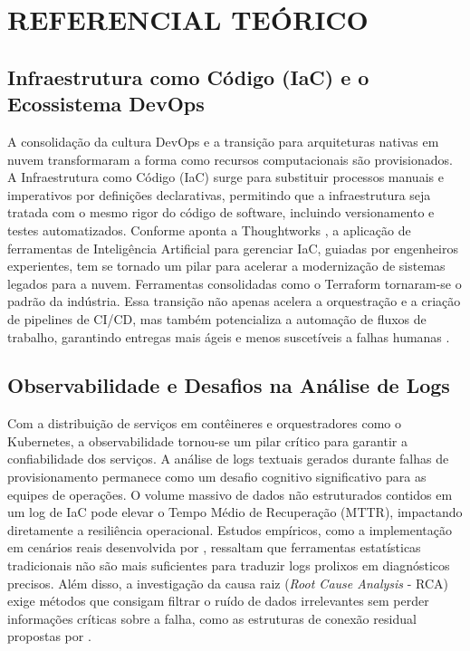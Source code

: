 \section{REFERENCIAL TEÓRICO}

\subsection{Infraestrutura como Código (IaC) e o Ecossistema DevOps}

A consolidação da cultura DevOps e a transição para arquiteturas nativas em nuvem transformaram a forma como recursos computacionais são provisionados. A Infraestrutura como Código (IaC) surge para substituir processos manuais e imperativos por definições declarativas, permitindo que a infraestrutura seja tratada com o mesmo rigor do código de software, incluindo versionamento e testes automatizados. Conforme aponta a Thoughtworks \cite{thoughtworks2026}, a aplicação de ferramentas de Inteligência Artificial para gerenciar IaC, guiadas por engenheiros experientes, tem se tornado um pilar para acelerar a modernização de sistemas legados para a nuvem. Ferramentas consolidadas como o Terraform tornaram-se o padrão da indústria. Essa transição não apenas acelera a orquestração e a criação de pipelines de CI/CD, mas também potencializa a automação de fluxos de trabalho, garantindo entregas mais ágeis e menos suscetíveis a falhas humanas \cite{thoughtworks2026}.

\subsection{Observabilidade e Desafios na Análise de Logs}

Com a distribuição de serviços em contêineres e orquestradores como o Kubernetes, a observabilidade tornou-se um pilar crítico para garantir a confiabilidade dos serviços. A análise de logs textuais gerados durante falhas de provisionamento permanece como um desafio cognitivo significativo para as equipes de operações. O volume massivo de dados não estruturados contidos em um log de IaC pode elevar o Tempo Médio de Recuperação (MTTR), impactando diretamente a resiliência operacional. Estudos empíricos, como a implementação em cenários reais desenvolvida por , ressaltam que ferramentas estatísticas tradicionais não são mais suficientes para traduzir logs prolixos em diagnósticos precisos. Além disso, a investigação da causa raiz (\textit{Root Cause Analysis} - RCA) exige métodos que consigam filtrar o ruído de dados irrelevantes sem perder informações críticas sobre a falha, como as estruturas de conexão residual propostas por .

